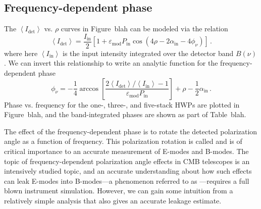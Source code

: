 
\subsection{Frequency-dependent phase}
\label{sec:frequency_dependent_phase}

The $\left< I_{\mathrm{det}} \right>$ vs. $\rho$ curves in Figure~blah can be modeled via the relation
\begin{equation}
    \left< I_{\mathrm{det}} \right> = \frac{I_{\mathrm{in}}}{2} \left[1  + \varepsilon_{\mathrm{mod}} P_{\mathrm{in}}  \cos \left( 4 \rho - 2 \alpha_{\mathrm{in}} - 4 \phi_{\nu} \right) \right] \, .
    \label{eq:analytic_function_fit_modulated_intensity}
\end{equation}
where here $\left< I_{\mathrm{in}} \right>$ is the input intensity integrated over the detector band $B(\nu)$. We can invert this relationship to write an analytic function for the frequency-dependent phase
\begin{equation}
    \phi_{\nu} = -\frac{1}{4} \arccos \left[ \frac{2 \left< I_{\mathrm{det}} \right> / \left< I_{\mathrm{in}} \right> - 1}{\varepsilon_{\mathrm{mod}} P_{\mathrm{in}}} \right] + \rho - \frac{1}{2} \alpha_{\mathrm{in}} \, .
    \label{eq:modulation_phase_function}
\end{equation}
Phase vs. frequency for the one-, three-, and five-stack HWPs are plotted in Figure~blah, and the band-integrated phases are shown as part of Table~blah.

The effect of the frequency-dependent phase is to rotate the detected polarization angle as a function of frequency. This polarization rotation is called  and is of critical importance to an accurate measurement of E-modes and B-modes. The topic of frequency-dependent polarization angle effects in CMB telescopes is an intensively studied topic, and an accurate understanding about how such effects can leak E-modes into B-modes---a phenomenon referred to as ---requires a full blown instrument simulation. However, we can gain some intuition from a relatively simple analysis that also gives an accurate leakage estimate.

